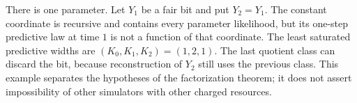 \begin{example}
\label{ex:v9-predictioncost}
There is one parameter. Let $Y_1$ be a fair bit and put $Y_2=Y_1$.
The constant coordinate is recursive and contains every parameter
likelihood, but its one-step predictive law at time $1$ is not a function
of that coordinate. The least saturated predictive widths are
$(K_0,K_1,K_2)=(1,2,1)$. The last quotient class can discard the bit,
because reconstruction of $Y_2$ still uses the previous class. This
example separates the hypotheses of the factorization theorem; it does
not assert impossibility of other simulators with other charged resources.
\end{example}
